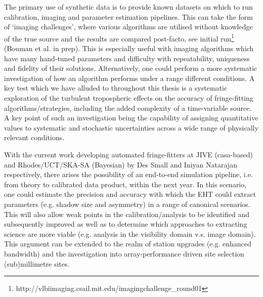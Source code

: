 The primary use of synthetic data is to provide known datasets on which to run calibration, imaging and parameter estimation pipelines. This can take the form of `imaging challenges', where various algorithms are utilised without knowledge of the true source and the results are compared post-facto, see initial run\footnote{http://vlbiimaging.csail.mit.edu/imagingchallenge\_round01} (Bouman et al. in prep). This is especially useful with imaging algorithms which have many hand-tuned parameters and difficulty with repeatability, uniqueness and fidelity of their solutions. Alternatively, one could perform a more systematic investigation of how an algorithm performs under a range different conditions. A key test which we have alluded to throughout this thesis is a systematic exploration of the turbulent tropospheric effects on the accuracy of fringe-fitting algorithms/strategies, including the added complexity of a time-variable source. A key point of such an investigation being the capability of assigning quantitative values to systematic and stochastic uncertainties across a wide range of physically relevant conditions.



With the current work developing automated fringe-fitters at JIVE ({\sc casa}-based) and Rhodes/UCT/SKA-SA (Bayesian) by Des Small and Iniyan Natarajan respectively, there arises the possibility of an end-to-end simulation pipeline, i.e. from theory to calibrated data product, within the next year. In this scenario, one could estimate the precision and accuracy with which the EHT could extract parameters (e.g. shadow size and asymmetry) in a range of canonical scenarios. This will also allow weak points in the calibration/analysis to be identified and subsequently improved as well as to determine which approaches to extracting science are more viable (e.g. analysis in the visibility domain v.s. image domain).
This argument can be extended to the realm of station upgrades (e.g. enhanced bandwidth) and the investigation into array-performance driven site selection (sub)millimetre sites. 


